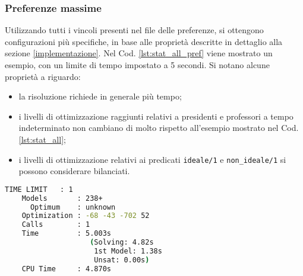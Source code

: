 \subsubsection*{Preferenze massime}
Utilizzando tutti i vincoli presenti nel file delle preferenze, si ottengono 
configurazioni più specifiche, in base alle proprietà descritte in dettaglio
alla sezione \ref{implementazione}. 
Nel Cod. \ref{lst:stat_all_pref} viene mostrato un esempio, con un limite 
di tempo impostato a 5 secondi. Si notano alcune proprietà a riguardo:
\begin{itemize}
    \item la risoluzione richiede in generale più tempo;
    \item i livelli di ottimizzazione raggiunti relativi a presidenti e 
        professori a tempo indeterminato non cambiano di molto rispetto 
        all'esempio mostrato nel Cod. \ref{lst:stat_all};
    \item i livelli di ottimizzazione relativi ai predicati \texttt{ideale/1} e 
        \texttt{non\_ideale/1} si possono considerare bilanciati.
\end{itemize}

\begin{lstlisting}[language=bash, captionpos=b, 
    caption={Statistiche clingo per tutti i corsi con preferenze massime.}, 
    label={lst:stat_all_pref},
    backgroundcolor=\color{lightgray!20},
    basicstyle=\ttfamily\footnotesize]
    TIME LIMIT   : 1
    Models       : 238+
      Optimum    : unknown
    Optimization : -68 -43 -702 52
    Calls        : 1
    Time         : 5.003s 
                    (Solving: 4.82s 
                     1st Model: 1.38s 
                     Unsat: 0.00s)
    CPU Time     : 4.870s
\end{lstlisting}
